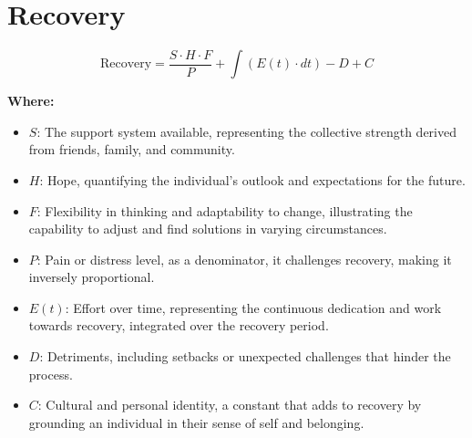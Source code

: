 \chapter{Recovery}

\begin{equation}
\text{Recovery} = \frac{S \cdot H \cdot F}{P} + \int (E(t) \cdot dt) - D + C
\end{equation}

\textbf{Where:}

\begin{itemize}
    \item $S$: The support system available, representing the collective strength derived from friends, family, and community.
    \item $H$: Hope, quantifying the individual’s outlook and expectations for the future.
    \item $F$: Flexibility in thinking and adaptability to change, illustrating the capability to adjust and find solutions in varying circumstances.
    \item $P$: Pain or distress level, as a denominator, it challenges recovery, making it inversely proportional.
    \item $E(t)$: Effort over time, representing the continuous dedication and work towards recovery, integrated over the recovery period.
    \item $D$: Detriments, including setbacks or unexpected challenges that hinder the process.
    \item $C$: Cultural and personal identity, a constant that adds to recovery by grounding an individual in their sense of self and belonging.
\end{itemize}